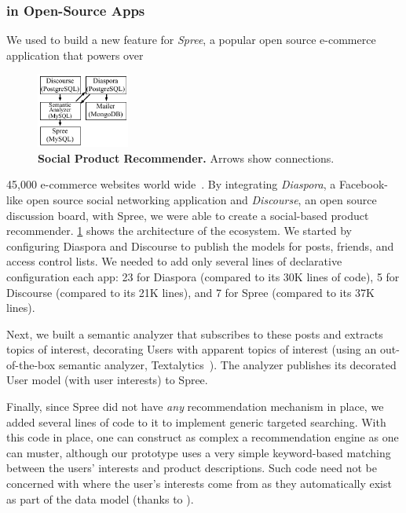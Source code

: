 \subsubsection{\synapse in Open-Source Apps}
\label{sec:apps:social}
\begingroup
\setlength{\columnsep}{6pt}
We used \synapse to build a new feature for \emph{Spree}, a popular open source
e-commerce application that powers over
\begin{figure}
\centering
   \includegraphics[width=1.2in]{figures/synapse/eco-social.pdf}
      \vspace{-6pt}
   \caption{\textbf{Social Product Recommender.} Arrows show \synapse
connections.}
   \label{fig:social-ecosystem}
\end{figure}
45,000 e-commerce websites world
wide~\cite{spree-site}.
By integrating \emph{Diaspora}, a Facebook-like open source social networking
application and \emph{Discourse}, an open source discussion board, with Spree,
we
were able to create a social-based product recommender.
\F\ref{fig:social-ecosystem} shows the architecture of the ecosystem.
We started by configuring Diaspora and Discourse to publish the models
for posts, friends, and access control lists.
We needed to add only several lines of declarative configuration each app: 23
for Diaspora (compared to its 30K lines of code), 5 for Discourse (compared to
its 21K lines), and 7 for Spree (compared to its 37K lines).

Next, we built a semantic analyzer that subscribes to these posts and extracts topics of interest, decorating Users with apparent topics of interest (using an out-of-the-box semantic analyzer, Textalytics~\cite{textalytics}).
The analyzer publishes its decorated {\code User} model (with user interests) to Spree.
\endgroup

Finally, since Spree did not have \emph{any} recommendation mechanism in place, we added several lines of code to it to implement generic targeted searching.
With this code in place, one can construct as complex a recommendation engine as
one can muster, although our prototype uses a very simple keyword-based matching
between the users' interests and product descriptions. Such code need not be
concerned with where the user's interests come from as they
automatically exist as part of the data model (thanks to \synapse).

